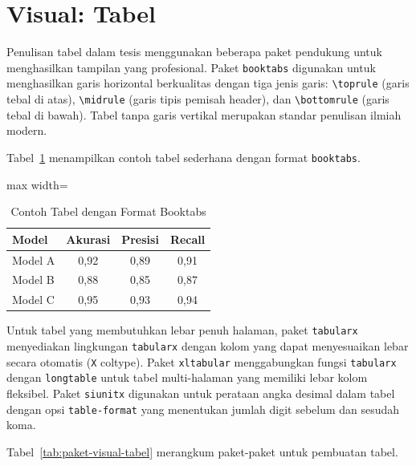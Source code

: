 \section{Visual: Tabel}

Penulisan tabel dalam tesis menggunakan beberapa paket pendukung untuk menghasilkan tampilan yang profesional. Paket \texttt{booktabs} digunakan untuk menghasilkan garis horizontal berkualitas dengan tiga jenis garis: \texttt{\textbackslash toprule} (garis tebal di atas), \texttt{\textbackslash midrule} (garis tipis pemisah header), dan \texttt{\textbackslash bottomrule} (garis tebal di bawah). Tabel tanpa garis vertikal merupakan standar penulisan ilmiah modern.

Tabel~\ref{tab:contoh-tabel} menampilkan contoh tabel sederhana dengan format \texttt{booktabs}.

\begin{table}[h]
  \centering
  \caption{Contoh Tabel dengan Format Booktabs}
  \label{tab:contoh-tabel}
  \begin{adjustbox}{max width=\textwidth}
  \begin{tabular}{lccc}
    \toprule
    \textbf{Model} & \textbf{Akurasi} & \textbf{Presisi} & \textbf{Recall} \\
    \midrule
    Model A & 0,92 & 0,89 & 0,91 \\
    Model B & 0,88 & 0,85 & 0,87 \\
    Model C & 0,95 & 0,93 & 0,94 \\
    \bottomrule
  \end{tabular}
  \end{adjustbox}
\end{table}

Untuk tabel yang membutuhkan lebar penuh halaman, paket \texttt{tabularx} menyediakan lingkungan \texttt{tabularx} dengan kolom yang dapat menyesuaikan lebar secara otomatis (\texttt{X} coltype). Paket \texttt{xltabular} menggabungkan fungsi \texttt{tabularx} dengan \texttt{longtable} untuk tabel multi-halaman yang memiliki lebar kolom fleksibel. Paket \texttt{siunitx} digunakan untuk perataan angka desimal dalam tabel dengan opsi \texttt{table-format} yang menentukan jumlah digit sebelum dan sesudah koma.

Tabel~\ref{tab:paket-visual-tabel} merangkum paket-paket untuk pembuatan tabel.

